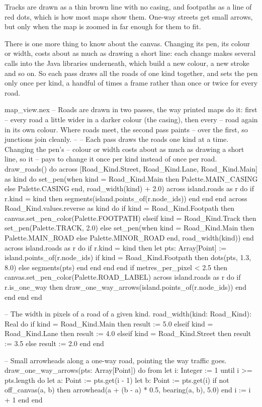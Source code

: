 Tracks are drawn as a thin brown line with no casing, and footpaths as a
line of red dots, which is how most maps show them. One-way streets get
small arrows, but only when the map is zoomed in far enough for them to
fit.

There is one more thing to know about the canvas. Changing its pen, its
colour or width, costs about as much as drawing a short line: each change
makes several calls into the Java libraries underneath, which build a new
colour, a new stroke and so on. So each pass draws all the roads of one
kind together, and sets the pen only once per kind, a handful of times a
frame rather than once or twice for every road.

\begin{continued}{map_view.nex}
  -- Roads are drawn in two passes, the way printed maps do it: first
  -- every road a little wider in a darker colour (the casing), then every
  -- road again in its own colour. Where roads meet, the second pass paints
  -- over the first, so junctions join cleanly.
  --
  -- Each pass draws the roads one kind at a time. Changing the pen's
  -- colour or width costs about as much as drawing a short line, so it
  -- pays to change it once per kind instead of once per road.
  draw_roads() do
    across [Road_Kind.Street, Road_Kind.Lane, Road_Kind.Main] as kind do
      set_pen(when kind = Road_Kind.Main then Palette.MAIN_CASING else Palette.CASING end,
        road_width(kind) + 2.0)
      across island.roads as r do
        if r.kind = kind then
          segments(island.points_of(r.node_ids))
        end
      end
    end
    across Road_Kind.values.reverse as kind do
      if kind = Road_Kind.Footpath then
        canvas.set_pen_color(Palette.FOOTPATH)
      elseif kind = Road_Kind.Track then
        set_pen(Palette.TRACK, 2.0)
      else
        set_pen(when kind = Road_Kind.Main then Palette.MAIN_ROAD else Palette.MINOR_ROAD end,
          road_width(kind))
      end
      across island.roads as r do
        if r.kind = kind then
          let pts: Array[Point] := island.points_of(r.node_ids)
          if kind = Road_Kind.Footpath then
            dots(pts, 1.3, 8.0)
          else
            segments(pts)
          end
        end
      end
    end
    if metres_per_pixel < 2.5 then
      canvas.set_pen_color(Palette.ROAD_LABEL)
      across island.roads as r do
        if r.is_one_way then
          draw_one_way_arrows(island.points_of(r.node_ids))
        end
      end
    end
  end

  -- The width in pixels of a road of a given kind.
  road_width(kind: Road_Kind): Real do
    if kind = Road_Kind.Main then
      result := 5.0
    elseif kind = Road_Kind.Lane then
      result := 4.0
    elseif kind = Road_Kind.Street then
      result := 3.5
    else
      result := 2.0
    end
  end

  -- Small arrowheads along a one-way road, pointing the way traffic goes.
  draw_one_way_arrows(pts: Array[Point]) do
    from
      let i: Integer := 1
    until
      i >= pts.length
    do
      let a: Point := pts.get(i - 1)
      let b: Point := pts.get(i)
      if not off_canvas(a, b) then
        arrowhead(a + (b - a) * 0.5, bearing(a, b), 5.0)
      end
      i := i + 1
    end
  end
\end{continued}

